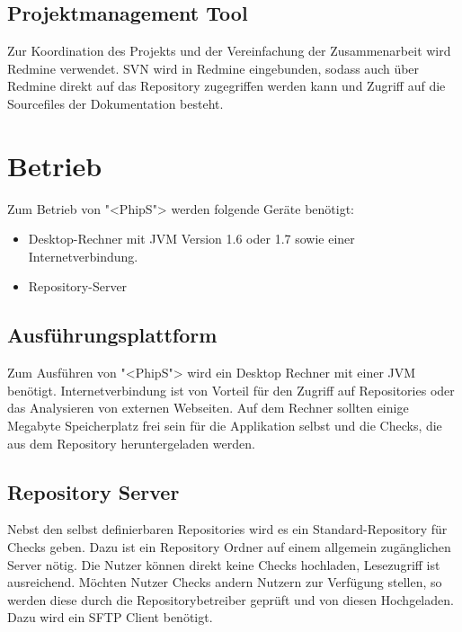 \subsection{Projektmanagement Tool}
Zur Koordination des Projekts und der Vereinfachung der Zusammenarbeit wird Redmine verwendet. SVN wird in Redmine eingebunden, sodass auch über Redmine direkt auf das Repository zugegriffen werden kann und Zugriff auf die Sourcefiles der Dokumentation besteht.

\section{Betrieb}
Zum Betrieb von "<PhipS"> werden folgende Geräte benötigt:
\begin{itemize}
	\setlength{\itemsep}{-\parsep}
	\item Desktop-Rechner mit JVM Version 1.6 oder 1.7 sowie einer Internetverbindung.
	\item Repository-Server
\end{itemize}

\subsection{Ausführungsplattform}
Zum Ausführen von "<PhipS"> wird ein Desktop Rechner mit einer JVM benötigt. Internetverbindung ist von Vorteil für den Zugriff auf Repositories oder das Analysieren von externen Webseiten. Auf dem Rechner sollten einige Megabyte Speicherplatz frei sein für die Applikation selbst und die Checks, die aus dem Repository heruntergeladen werden.

\subsection{Repository Server}
Nebst den selbst definierbaren Repositories wird es ein Standard-Repository für Checks geben. Dazu ist ein Repository Ordner auf einem allgemein zugänglichen Server nötig. Die Nutzer können direkt keine Checks hochladen, Lesezugriff ist ausreichend. Möchten Nutzer Checks andern Nutzern zur Verfügung stellen, so werden diese durch die Repositorybetreiber geprüft und von diesen Hochgeladen. Dazu wird ein \ac{SFTP} Client benötigt.


